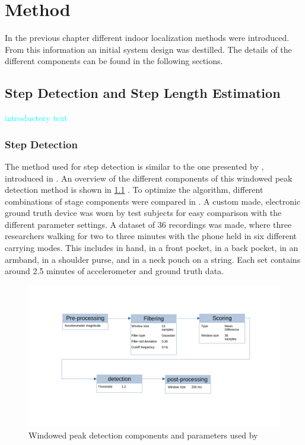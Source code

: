 \chapter{Method}

In the previous chapter different indoor localization methods were introduced. From this information an initial system design was destilled. The details of the different components can be found in the following sections.

\section{Step Detection and Step Length Estimation}

\textcolor{cyan}{introductory text}

\subsection*{Step Detection}
\label{sec:meth - step detection}
The method used for step detection is similar to the one presented by \cite{Salvi2018}, introduced in . 
 An overview of the different components of this windowed peak detection method is shown in \cref{fig:step_detection} . To optimize the algorithm, different combinations of stage components were compared in \cite{Salvi2018}. A custom made, electronic ground truth device was worn by test subjects for easy comparison with the different parameter settings. A dataset of 36 recordings was made,  where three researchers walking for two to three minutes with the phone held in six different carrying modes. This includes in hand, in a front pocket, in a back pocket, in an armband, in a shoulder purse, and in a neck pouch on a string. Each set contains around 2.5 minutes of accelerometer and ground truth data.
\begin{figure}
	\centering
	\includegraphics[trim=20 100 50 80, clip, width=0.7\linewidth]{images/step_detection}
	\caption{Windowed peak detection components and parameters used by \cite{Salvi2018}}
	\label{fig:step_detection}
\end{figure}

